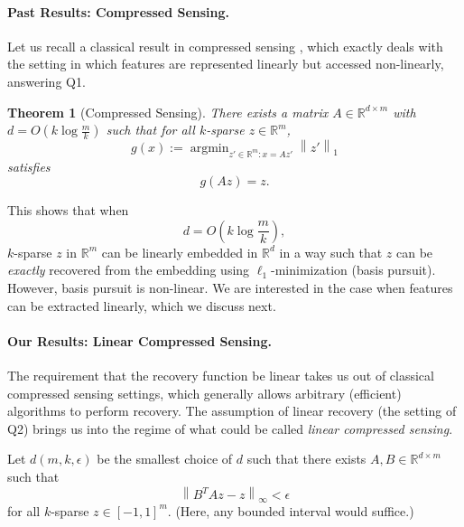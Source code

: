 \documentclass[11pt]{article}
\newtheorem{theorem}{Theorem}
\newcommand{\RR}{\mathbb{R}}
\newcommand{\norm}[1]{\left\|#1\right\|}
\DeclareMathOperator{\argmin}{argmin}
\begin{document}
\paragraph{Past Results: Compressed Sensing.} 
Let us recall a classical result in compressed sensing \citep{candes2006near, candes2006robust, donoho2006compressed}, which exactly deals with the setting in which features are represented linearly but accessed non-linearly, answering Q1.
\begin{theorem}[Compressed Sensing]\label{thm:compressed-sensing}
    There exists a matrix $A\in \RR^{d\times m}$ with $d = O\left(k\log \frac{m}{k}\right)$
    such that for all $k$-sparse $z\in \RR^m$,
    \begin{equation}
        g(x) := \argmin_{z'\in \RR^m: x=Az'} \norm{z'}_1
    \end{equation}
    satisfies
    \begin{equation}
        g(Az) = z.
    \end{equation}
\end{theorem}

This shows that when 
\begin{equation}
    d = O\left(k\log \frac{m}{k}\right),
\end{equation}
$k$-sparse $z$ in $\RR^m$ can be linearly embedded in $\RR^d$ in a way such that $z$ can be \textit{exactly} recovered from the embedding using $\ell_1$-minimization (basis pursuit). However, basis pursuit is non-linear. We are interested in the case when features can be extracted linearly, which we discuss next.

\paragraph{Our Results: Linear Compressed Sensing.} The requirement that the recovery function be linear takes us out of classical compressed sensing settings, which generally allows arbitrary (efficient) algorithms to perform recovery. The assumption of linear recovery (the setting of Q2) brings us into the regime of what could be called \textit{linear compressed sensing}.

Let $d(m,k,\epsilon)$ be the smallest choice of $d$ such that there exists $A,B\in \RR^{d\times m}$ such that
\begin{equation}
    \norm{B^TAz - z}_\infty < \epsilon
\end{equation}
for all $k$-sparse $z\in [-1,1]^m$. (Here, any bounded interval would suffice.)
\end{document}
